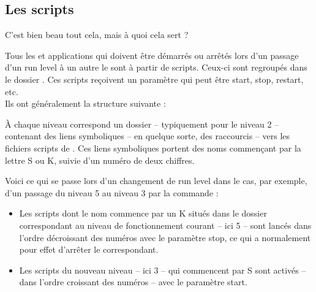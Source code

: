 \subsection{Les scripts}
C'est bien beau tout cela, mais à quoi cela sert ?\par
Tous les  et applications qui doivent être démarrés ou arrêtés lors d'un passage d'un run level à un autre le sont à partir de scripts. Ceux-ci sont regroupés dans le dossier . Ces scripts reçoivent un paramètre qui peut être start, stop, restart, etc.\\
Ils ont généralement la structure suivante :\par
{}
À chaque niveau correspond un dossier -- typiquement  pour le niveau 2 -- contenant des liens symboliques -- en quelque sorte, des raccourcis -- vers les fichiers scripts de . Ces liens symboliques portent des noms commençant par la lettre S ou K, suivie d'un numéro de deux chiffres.\par
Voici ce qui se passe lors d'un changement de run level dans le cas, par exemple, d'un passage du niveau 5 au niveau 3 par la commande  :\par
\begin{itemize}
\item Les scripts dont le nom commence par un K situés dans le dossier correspondant au niveau de fonctionnement courant -- ici 5 -- sont lancés dans l'ordre décroissant des numéros avec le paramètre stop, ce qui a normalement pour effet d'arrêter le  correspondant. 
\item Les scripts du nouveau niveau -- ici 3 -- qui commencent par S sont activés -- dans l'ordre croissant des numéros -- avec le paramètre start. 
\end{itemize}

